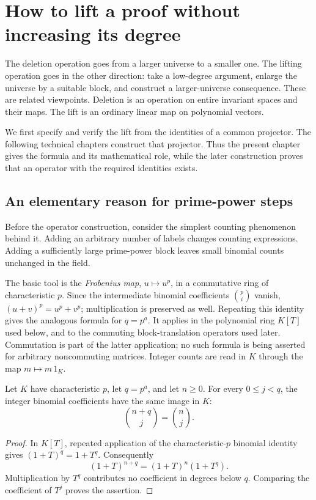 \chapter{How to lift a proof without increasing its degree}
\label{tx:chap:lift}
The deletion operation goes from a larger universe to a smaller one.
The lifting operation goes in the other direction: take a low-degree
argument, enlarge the universe by a suitable block, and construct
a larger-universe consequence. These are related viewpoints.
Deletion is an operation on entire invariant spaces and their maps.
The lift is an ordinary linear map on polynomial vectors.

We first specify and verify the lift from the identities of a common
projector. The following technical chapters construct that projector.
Thus the present chapter gives the formula and its mathematical role,
while the later construction proves that an operator with the required
identities exists.

\section{An elementary reason for prime-power steps}
Before the operator construction, consider the simplest counting
phenomenon behind it. Adding an arbitrary number of labels changes
counting expressions. Adding a sufficiently large prime-power block
leaves small binomial counts unchanged in the field.

The basic tool is the \emph{Frobenius map}, $u\mapsto u^p$, in a
commutative ring of characteristic $p$.
Since the intermediate binomial coefficients $\binom pi$ vanish,
$(u+v)^p=u^p+v^p$; multiplication is preserved as well.
Repeating this identity gives the analogous formula for $q=p^a$.
It applies in the polynomial ring $K[T]$ used below, and to the
commuting block-translation operators used later.
Commutation is part of the latter application; no such formula is
being asserted for arbitrary noncommuting matrices.
Integer counts are read in $K$ through the map $m\mapsto m\,1_K$.

\begin{lemma}\label{tx:lem:prime-counts}
Let $K$ have characteristic $p$, let $q=p^a$, and let $n\ge0$.
For every $0\le j<q$, the integer binomial coefficients have the same
image in $K$:
\[
                         \binom{n+q}{j}=\binom nj.
\]
\end{lemma}
\begin{proof}
In $K[T]$, repeated application of the characteristic-$p$ binomial
identity gives $(1+T)^q=1+T^q$. Consequently
\[
                  (1+T)^{n+q}=(1+T)^n(1+T^q).
\]
Multiplication by $T^q$ contributes no coefficient in degrees below
$q$. Comparing the coefficient of $T^j$ proves the assertion.
\end{proof}

